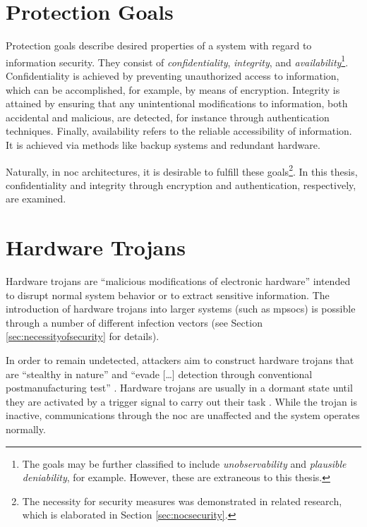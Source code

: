\section{Protection Goals}\label{sec:protectiongoals}
Protection goals describe desired properties of a system with regard to information security. They consist of \textit{confidentiality},
\textit{integrity}, and \textit{availability}\footnote{The goals may be further classified to include \textit{unobservability} and \textit{plausible
deniability}, for example. However, these are extraneous to this thesis.}. Confidentiality is achieved by preventing unauthorized access to information, which
can be accomplished, for example, by means of encryption. Integrity is attained by ensuring that any unintentional modifications to information, both accidental and
malicious, are detected, for instance through authentication techniques. Finally, availability refers to the reliable accessibility of information. It is
achieved via methods like backup systems and redundant hardware.

Naturally, in \gls{noc} architectures, it is desirable to fulfill these goals\footnote{The necessity for security measures was demonstrated in
related research, which is elaborated in Section \ref{sec:nocsecurity}.}. In this thesis, confidentiality and integrity through encryption and
authentication, respectively, are examined.

\section{Hardware Trojans}\label{sec:hardwaretrojans}
Hardware trojans are \enquote{malicious modifications of electronic hardware} \cite[1]{bhunia14hardwaretrojans} intended to disrupt normal
system behavior or to extract sensitive information. The introduction of hardware trojans into larger systems (such as \glspl{mpsoc}) is possible
through a number of different infection vectors (see Section \ref{sec:necessityofsecurity} for details).

In order to remain undetected, attackers aim to construct hardware trojans that are \enquote{stealthy in nature} \cite[1]{bhunia14hardwaretrojans}
and \enquote{evade […] detection through conventional postmanufacturing test} \cite[1]{bhunia14hardwaretrojans}. Hardware trojans are usually in a
dormant state until they are activated by a trigger signal to carry out their task \cites{bhunia14hardwaretrojans}{ancajas14fortnocs}. While the
trojan is inactive, communications through the \gls{noc} are unaffected and the system operates normally.

